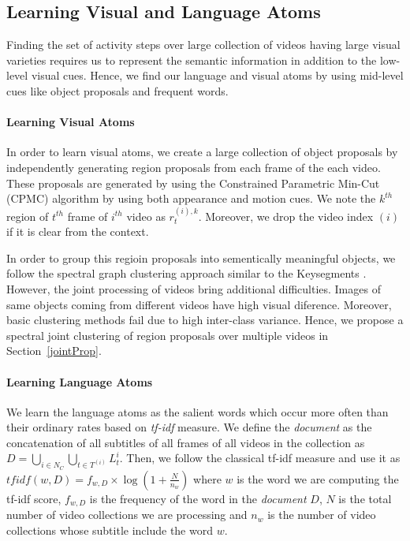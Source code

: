 \subsection{Learning Visual and Language Atoms}
\label{atom}
Finding the set of activity steps over large collection of videos having large visual varieties requires us to represent the semantic information in addition to the low-level visual cues. Hence, we find our language and visual atoms by using mid-level cues like object proposals and frequent words.


\paragraph{Learning Visual Atoms}
In order to learn visual atoms, we create a large collection of object proposals by independently generating region proposals from each frame of the each video. These proposals are generated by using the Constrained Parametric Min-Cut (CPMC) \cite{cpmc} algorithm by using both appearance and motion cues. We note the $k^{th}$ region of $t^{th}$ frame of $i^{th}$ video as $r^{(i),k}_t$. Moreover, we drop the video index $(i)$ if it is clear from the context.

In order to group this regioin proposals into sementically meaningful objects, we follow the spectral graph clustering approach similar to the Keysegments \cite{keysegments}. However, the joint processing of videos bring additional difficulties. Images of same objects coming from different videos have high visual diference. Moreover, basic clustering methods fail due to high inter-class variance. Hence, we propose a spectral joint clustering of region proposals over multiple videos in Section~\ref{jointProp}.

\paragraph{Learning Language Atoms}
We learn the language atoms as the salient words which occur more often than their ordinary rates based on \emph{tf-idf} measure. We define the \emph{document} as the concatenation of all subtitles of all frames of all videos in the collection as $D=\bigcup_{i \in N_C} \bigcup_{t \in T^{(i)}} L_t^i$. Then, we follow the classical tf-idf measure and use it as $tfidf(w,D)=f_{w,D} \times \log \left( 1+ \frac{N}{n_{w}}\right)$ where $w$ is the word we are computing the tf-idf score, $f_{w,D}$ is the frequency of the word in the \emph{document} $D$, $N$ is the total number of video collections we are processing and $n_{w}$ is the number of video collections whose subtitle include the word $w$.

